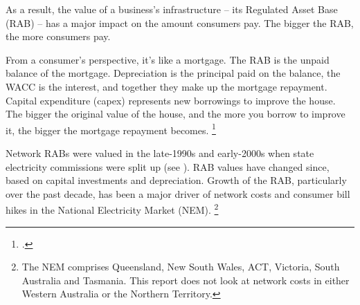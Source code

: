 \documentclass[FrontPage]{grattan}
\begin{document}
As a result, the value of a business's infrastructure -- its Regulated Asset Base (RAB) -- has a major impact on the amount consumers pay. The bigger the RAB, the more consumers pay.

From a consumer's perspective, it's like a mortgage. The RAB is the unpaid balance of the mortgage. Depreciation is the principal paid on the balance, the WACC is the interest, and together they make up the mortgage repayment. Capital expenditure (capex) represents new borrowings to improve the house. The bigger the original value of the house, and the more you borrow to improve it, the bigger the mortgage repayment becomes.%
\footcite{AER2015consumerguide}

Network RABs were valued in the late-1990s and early-2000s when state electricity commissions were split up (see ). RAB values have changed since, based on capital investments and depreciation. Growth of the RAB, particularly over the past decade, has been a major driver of network costs and consumer bill hikes in the National Electricity Market (NEM\@).%
\footnote{The NEM comprises Queensland, New South Wales, ACT, Victoria, South Australia and Tasmania. This report does not look at network costs in either Western Australia or the Northern Territory.}
\end{document}
